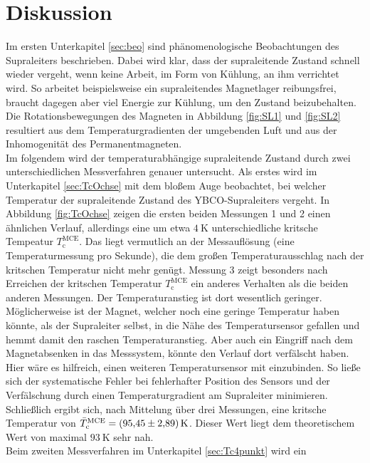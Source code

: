 \section{Diskussion}
\label{sec:Diskussion}

Im ersten Unterkapitel \ref{sec:beo} sind phänomenologische Beobachtungen des Supraleiters
beschrieben. Dabei wird klar, dass der supraleitende Zustand schnell wieder vergeht,
wenn keine Arbeit, im Form von Kühlung, an ihm verrichtet wird. So arbeitet
beispielsweise ein supraleitendes Magnetlager reibungsfrei, braucht dagegen
aber viel Energie zur Kühlung, um den Zustand beizubehalten. Die Rotationsbewegungen
des Magneten in Abbildung \ref{fig:SL1} und \ref{fig:SL2} resultiert aus dem
Temperaturgradienten der umgebenden Luft und aus der Inhomogenität des Permanentmagneten.\\
Im folgendem wird der temperaturabhängige supraleitende
Zustand durch zwei unterschiedlichen Messverfahren genauer untersucht. Als
erstes wird im Unterkapitel \ref{sec:TcOchse} mit dem bloßem Auge beobachtet,
bei welcher Temperatur der supraleitende Zustand des YBCO-Supraleiters vergeht.
In Abbildung \ref{fig:TcOchse} zeigen die ersten beiden Messungen 1 und 2 einen
ähnlichen Verlauf, allerdings eine um etwa $\SI{4}{\kelvin}$ unterschiedliche
kritsche Tempeatur $T^{\text{MCE}}_{\text{c}}$.
Das liegt vermutlich an der Messauflösung (eine Temperaturmessung pro Sekunde),
die dem großen Temperaturausschlag nach der kritschen Temperatur nicht mehr genügt.
Messung 3 zeigt besonders nach Erreichen der kritschen Temperatur $T^{\text{MCE}}_{\text{c}}$
ein anderes Verhalten als die beiden anderen Messungen. Der Temperaturanstieg
ist dort wesentlich geringer. Möglicherweise ist der Magnet, welcher noch eine
geringe Temperatur haben könnte, als der Supraleiter selbst, in die Nähe des
Temperatursensor gefallen und hemmt damit den raschen Temperaturanstieg. Aber auch
ein Eingriff nach dem Magnetabsenken in das Messsystem, könnte den Verlauf dort
verfälscht haben.
Hier wäre es hilfreich, einen weiteren Temperatursensor mit einzubinden.
So ließe sich der systematische Fehler bei fehlerhafter Position des Sensors und
der Verfälschung durch einen Temperaturgradient am Supraleiter minimieren.
Schließlich ergibt sich, nach Mittelung über drei Messungen, eine kritsche Temperatur
von $\bar{T}^{\text{MCE}}_{\text{c}} = \SI{95.45\pm2.89}{\kelvin}$. Dieser Wert
liegt dem theoretischem Wert von maximal $\SI{93}{\kelvin}$ \cite[S. 62]{Hohenester}
sehr nah. \\
Beim zweiten Messverfahren im Unterkapitel \ref{sec:Tc4punkt} wird ein
